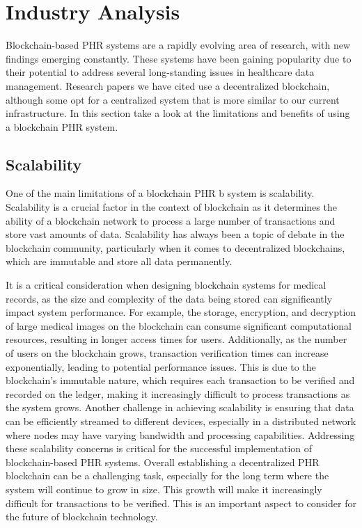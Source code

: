 \documentclass{article}
\begin{document}


\section{Industry Analysis}
Blockchain-based PHR systems are a rapidly evolving area of research, with new findings emerging constantly. These systems have been gaining popularity due to their potential to address several long-standing issues in healthcare data management. Research papers we have cited use a decentralized blockchain, although some opt for a centralized system that is more similar to our current infrastructure. In this section take a look at the limitations and benefits of using a blockchain PHR system. 
\subsection{Scalability}
One of the main limitations of a blockchain PHR b system is scalability. Scalability is a crucial factor in the context of blockchain as it determines the ability of a blockchain network to process a large number of transactions and store vast amounts of data. Scalability has always been a topic of debate in the blockchain community, particularly when it comes to decentralized blockchains, which are immutable and store all data permanently.


It is a critical consideration when designing blockchain systems for medical records, as the size and complexity of the data being stored can significantly impact system performance. For example, the storage, encryption, and decryption of large medical images on the blockchain can consume significant computational resources, resulting in longer access times for users. Additionally, as the number of users on the blockchain grows, transaction verification times can increase exponentially, leading to potential performance issues. This is due to the blockchain's immutable nature, which requires each transaction to be verified and recorded on the ledger, making it increasingly difficult to process transactions as the system grows. Another challenge in achieving scalability is ensuring that data can be efficiently streamed to different devices, especially in a distributed network where nodes may have varying bandwidth and processing capabilities. Addressing these scalability concerns is critical for the successful implementation of blockchain-based PHR systems. Overall establishing a decentralized PHR blockchain can be a challenging task, especially for the long term where the system will continue to grow in size. This growth will make it increasingly difficult for transactions to be verified. This is an important aspect to consider for the future of blockchain technology.
\end{document}
